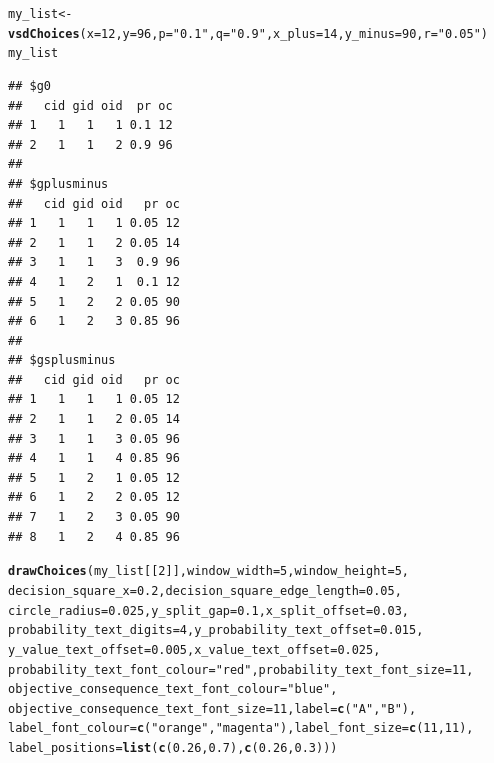 \documentclass{article}\usepackage[]{graphicx}\usepackage[]{color}
\makeatletter
\newcommand{\hlnum}[1]{\textcolor[rgb]{0.686,0.059,0.569}{#1}}%
\newcommand{\hlstr}[1]{\textcolor[rgb]{0.192,0.494,0.8}{#1}}%
\newcommand{\hlstd}[1]{\textcolor[rgb]{0.345,0.345,0.345}{#1}}%
\newcommand{\hlkwb}[1]{\textcolor[rgb]{0.69,0.353,0.396}{#1}}%
\newcommand{\hlkwc}[1]{\textcolor[rgb]{0.333,0.667,0.333}{#1}}%
\newcommand{\hlkwd}[1]{\textcolor[rgb]{0.737,0.353,0.396}{\textbf{#1}}}%
\newenvironment{kframe}{%
 \def\at@end@of@kframe{}%
 \ifinner\ifhmode%
  \def\at@end@of@kframe{\end{minipage}}%
  \begin{minipage}{\columnwidth}%
 \fi\fi%
 \def\FrameCommand##1{\hskip\@totalleftmargin \hskip-\fboxsep
 \colorbox{shadecolor}{##1}\hskip-\fboxsep
     \hskip-\linewidth \hskip-\@totalleftmargin \hskip\columnwidth}%
 \MakeFramed {\advance\hsize-\width
   \@totalleftmargin\z@ \linewidth\hsize
   \@setminipage}}%
 {\par\unskip\endMakeFramed%
 \at@end@of@kframe}
\newenvironment{knitrout}{}{} %
\makeatother
\begin{document}
\begin{knitrout}
\color{fgcolor}\begin{kframe}
\begin{alltt}
\hlstd{my_list} \hlkwb{<-} \hlkwd{vsdChoices}\hlstd{(}\hlkwc{x}\hlstd{=}\hlnum{12}\hlstd{,} \hlkwc{y}\hlstd{=}\hlnum{96}\hlstd{,} \hlkwc{p}\hlstd{=}\hlstr{"0.1"}\hlstd{,} \hlkwc{q}\hlstd{=}\hlstr{"0.9"}\hlstd{,} \hlkwc{x_plus}\hlstd{=}\hlnum{14}\hlstd{,} \hlkwc{y_minus}\hlstd{=}\hlnum{90}\hlstd{,} \hlkwc{r}\hlstd{=}\hlstr{"0.05"}\hlstd{)}
\hlstd{my_list}
\end{alltt}
\begin{verbatim}
## $g0
##   cid gid oid  pr oc
## 1   1   1   1 0.1 12
## 2   1   1   2 0.9 96
## 
## $gplusminus
##   cid gid oid   pr oc
## 1   1   1   1 0.05 12
## 2   1   1   2 0.05 14
## 3   1   1   3  0.9 96
## 4   1   2   1  0.1 12
## 5   1   2   2 0.05 90
## 6   1   2   3 0.85 96
## 
## $gsplusminus
##   cid gid oid   pr oc
## 1   1   1   1 0.05 12
## 2   1   1   2 0.05 14
## 3   1   1   3 0.05 96
## 4   1   1   4 0.85 96
## 5   1   2   1 0.05 12
## 6   1   2   2 0.05 12
## 7   1   2   3 0.05 90
## 8   1   2   4 0.85 96
\end{verbatim}
\begin{alltt}
\hlkwd{drawChoices}\hlstd{(my_list[[}\hlnum{2}\hlstd{]],} \hlkwc{window_width}\hlstd{=}\hlnum{5}\hlstd{,} \hlkwc{window_height}\hlstd{=}\hlnum{5}\hlstd{,}
        \hlkwc{decision_square_x}\hlstd{=}\hlnum{0.2}\hlstd{,} \hlkwc{decision_square_edge_length}\hlstd{=}\hlnum{0.05}\hlstd{,}
        \hlkwc{circle_radius}\hlstd{=}\hlnum{0.025}\hlstd{,} \hlkwc{y_split_gap}\hlstd{=}\hlnum{0.1}\hlstd{,} \hlkwc{x_split_offset}\hlstd{=}\hlnum{0.03}\hlstd{,}
        \hlkwc{probability_text_digits}\hlstd{=}\hlnum{4}\hlstd{,} \hlkwc{y_probability_text_offset}\hlstd{=}\hlnum{0.015}\hlstd{,}
        \hlkwc{y_value_text_offset}\hlstd{=}\hlnum{0.005}\hlstd{,} \hlkwc{x_value_text_offset}\hlstd{=}\hlnum{0.025}\hlstd{,}
        \hlkwc{probability_text_font_colour}\hlstd{=}\hlstr{"red"}\hlstd{,} \hlkwc{probability_text_font_size}\hlstd{=}\hlnum{11}\hlstd{,}
        \hlkwc{objective_consequence_text_font_colour}\hlstd{=}\hlstr{"blue"}\hlstd{,}
        \hlkwc{objective_consequence_text_font_size}\hlstd{=}\hlnum{11}\hlstd{,} \hlkwc{label}\hlstd{=}\hlkwd{c}\hlstd{(}\hlstr{"A"}\hlstd{,}\hlstr{"B"}\hlstd{),}
        \hlkwc{label_font_colour}\hlstd{=}\hlkwd{c}\hlstd{(}\hlstr{"orange"}\hlstd{,}\hlstr{"magenta"}\hlstd{),} \hlkwc{label_font_size}\hlstd{=}\hlkwd{c}\hlstd{(}\hlnum{11}\hlstd{,}\hlnum{11}\hlstd{),}
        \hlkwc{label_positions}\hlstd{=}\hlkwd{list}\hlstd{(}\hlkwd{c}\hlstd{(}\hlnum{0.26}\hlstd{,}\hlnum{0.7}\hlstd{),}\hlkwd{c}\hlstd{(}\hlnum{0.26}\hlstd{,}\hlnum{0.3}\hlstd{)))}
\end{alltt}
\end{kframe}


\end{knitrout}
\end{document}
